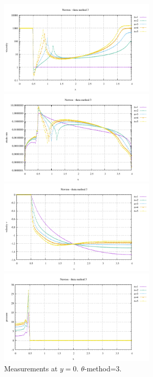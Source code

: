 \begin{center}
\includegraphics[width=7.5cm]{python_codes/fieldstone_87/results/experiment_11/bottom_profile_eta.pdf}
\includegraphics[width=7.5cm]{python_codes/fieldstone_87/results/experiment_11/bottom_profile_sr.pdf}
\includegraphics[width=7.5cm]{python_codes/fieldstone_87/results/experiment_11/bottom_profile_v.pdf}
\includegraphics[width=7.5cm]{python_codes/fieldstone_87/results/experiment_11/bottom_profile_p.pdf}\\
{\captionfont Measurements at $y=0$. $\theta$-method=3.}
\end{center}

